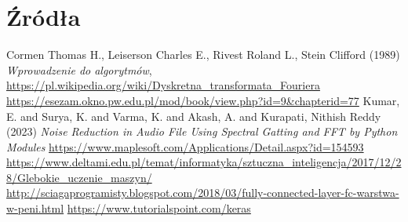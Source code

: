 \documentclass[polish]{article}
\begin{document}
\section{Źródła}
\begin{thebibliography}{2}
 Cormen Thomas H., Leiserson Charles E., Rivest Roland L., Stein Clifford (1989) \emph{Wprowadzenie do algorytmów},
\url{https://pl.wikipedia.org/wiki/Dyskretna_transformata_Fouriera}
\url{https://esezam.okno.pw.edu.pl/mod/book/view.php?id=9&chapterid=77}
Kumar, E. and Surya, K. and Varma, K. and Akash, A. and Kurapati, Nithish Reddy (2023) \emph{Noise Reduction in Audio File Using Spectral Gatting and FFT by Python Modules}
\url{https://www.maplesoft.com/Applications/Detail.aspx?id=154593}
\url{https://www.deltami.edu.pl/temat/informatyka/sztuczna_inteligencja/2017/12/28/Glebokie_uczenie_maszyn/}
\url{http://sciagaprogramisty.blogspot.com/2018/03/fully-connected-layer-fc-warstwa-w-peni.html}
\url{https://www.tutorialspoint.com/keras}
\end{thebibliography}
\end{document}
